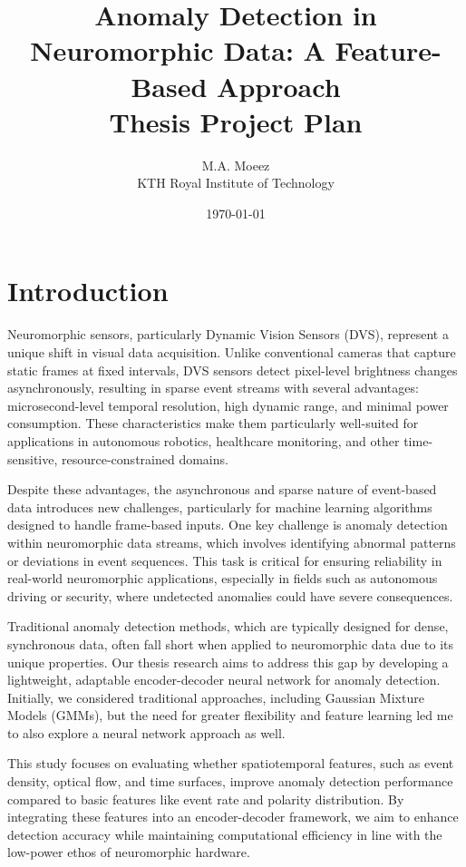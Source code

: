 \documentclass[12pt,a4paper]{article}
\title{\textbf{\Large Anomaly Detection in Neuromorphic Data: A Feature-Based Approach} \\ \vspace{0.5cm} \textbf{Thesis Project Plan}}
\author{M.A. Moeez \\ KTH Royal Institute of Technology}
\date{\today}
\begin{document}
\maketitle
\tableofcontents
\newpage

\section{Introduction}

Neuromorphic sensors, particularly Dynamic Vision Sensors (DVS), represent a unique shift in visual data acquisition. Unlike conventional cameras that capture static frames at fixed intervals, DVS sensors detect pixel-level brightness changes asynchronously, resulting in sparse event streams with several advantages: microsecond-level temporal resolution, high dynamic range, and minimal power consumption. These characteristics make them particularly well-suited for applications in autonomous robotics, healthcare monitoring, and other time-sensitive, resource-constrained domains.

Despite these advantages, the asynchronous and sparse nature of event-based data introduces new challenges, particularly for machine learning algorithms designed to handle frame-based inputs. One key challenge is anomaly detection within neuromorphic data streams, which involves identifying abnormal patterns or deviations in event sequences. This task is critical for ensuring reliability in real-world neuromorphic applications, especially in fields such as autonomous driving or security, where undetected anomalies could have severe consequences.

Traditional anomaly detection methods, which are typically designed for dense, synchronous data, often fall short when applied to neuromorphic data due to its unique properties. Our thesis research aims to address this gap by developing a lightweight, adaptable encoder-decoder neural network for anomaly detection. Initially, we considered traditional approaches, including Gaussian Mixture Models (GMMs), but the need for greater flexibility and feature learning led me to also explore a neural network approach as well.

This study focuses on evaluating whether spatiotemporal features, such as event density, optical flow, and time surfaces, improve anomaly detection performance compared to basic features like event rate and polarity distribution. By integrating these features into an encoder-decoder framework, we aim to enhance detection accuracy while maintaining computational efficiency in line with the low-power ethos of neuromorphic hardware.
\end{document}
